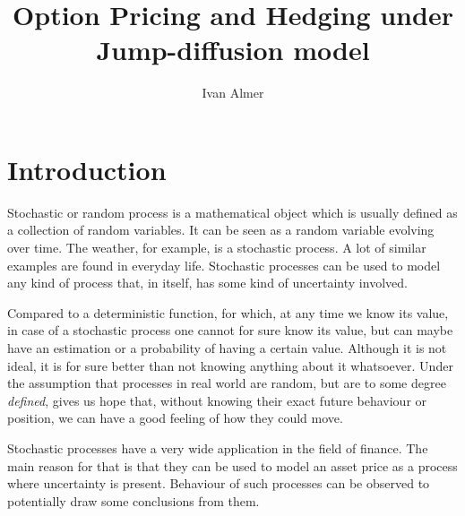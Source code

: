 \documentclass[times, utf8, diplomski]{fer}
\begin{document}
\renewcommand*\contentsname{Table of contents}
\newcommand\indeq{\mathrel{\overset{\makebox[0pt]{\mbox{\normalfont\tiny\sffamily ind.}}}{=}}}
\newtheorem{proposition}{Proposition}
\newtheorem{theorem}{Theorem}
\newtheorem{definition}{Definition}

\renewcommand{\labelitemi}{$\bullet$}


\title{Option Pricing and Hedging under Jump-diffusion model}

\author{Ivan Almer}

\maketitle



\tableofcontents

\chapter{Introduction}
Stochastic or random process is a mathematical object which is usually defined as a collection of random variables. It can be seen as a random variable evolving over time. The weather, for example, is a stochastic process. A lot of similar examples are found in everyday life. Stochastic processes can be used to model any kind of process that, in itself, has some kind of uncertainty involved. 

Compared to a deterministic function, for which, at any time we know its value, in case of a stochastic process one cannot for sure know its value, but can maybe have an estimation or a probability of having a certain value. Although it is not ideal, it is for sure better than not knowing anything about it whatsoever. Under the assumption that processes in real world are random, but are to some degree \textit{defined}, gives us hope that, without knowing their exact future behaviour or position, we can have a good feeling of how they could move.

Stochastic processes have a very wide application in the field of finance. The main reason for that is that they can be used to model an asset price as a process where uncertainty is present. Behaviour of such processes can be observed to potentially draw some conclusions from them. 
\end{document}
